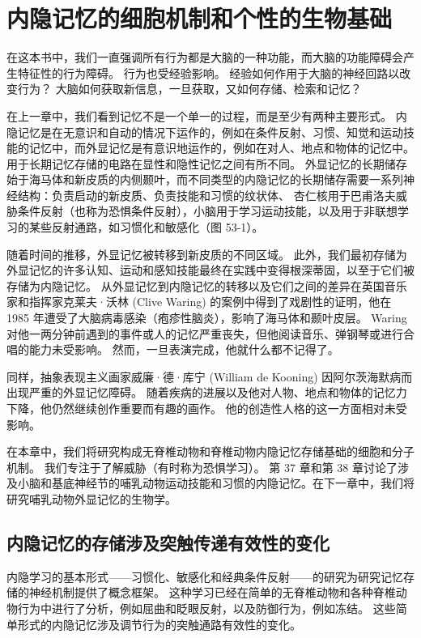 \chapter{内隐记忆的细胞机制和个性的生物基础}

在这本书中，我们一直强调所有行为都是大脑的一种功能，而大脑的功能障碍会产生特征性的行为障碍。 行为也受经验影响。 经验如何作用于大脑的神经回路以改变行为？ 大脑如何获取新信息，一旦获取，又如何存储、检索和记忆？

在上一章中，我们看到记忆不是一个单一的过程，而是至少有两种主要形式。 内隐记忆是在无意识和自动的情况下运作的，例如在条件反射、习惯、知觉和运动技能的记忆中，而外显记忆是有意识地运作的，例如在对人、地点和物体的记忆中。 用于长期记忆存储的电路在显性和隐性记忆之间有所不同。 外显记忆的长期储存始于海马体和新皮质的内侧颞叶，而不同类型的内隐记忆的长期储存需要一系列神经结构：负责启动的新皮质、负责技能和习惯的纹状体、 杏仁核用于巴甫洛夫威胁条件反射（也称为恐惧条件反射），小脑用于学习运动技能，以及用于非联想学习的某些反射通路，如习惯化和敏感化（图 53-1）。

随着时间的推移，外显记忆被转移到新皮质的不同区域。 此外，我们最初存储为外显记忆的许多认知、运动和感知技能最终在实践中变得根深蒂固，以至于它们被存储为内隐记忆。 从外显记忆到内隐记忆的转移以及它们之间的差异在英国音乐家和指挥家克莱夫·沃林 (Clive Waring) 的案例中得到了戏剧性的证明，他在 1985 年遭受了大脑病毒感染（疱疹性脑炎），影响了海马体和颞叶皮层。 Waring 对他一两分钟前遇到的事件或人的记忆严重丧失，但他阅读音乐、弹钢琴或进行合唱的能力未受影响。 然而，一旦表演完成，他就什么都不记得了。

同样，抽象表现主义画家威廉·德·库宁 (William de Kooning) 因阿尔茨海默病而出现严重的外显记忆障碍。 随着疾病的进展以及他对人物、地点和物体的记忆力下降，他仍然继续创作重要而有趣的画作。 他的创造性人格的这一方面相对未受影响。

在本章中，我们将研究构成无脊椎动物和脊椎动物内隐记忆存储基础的细胞和分子机制。 我们专注于了解威胁（有时称为恐惧学习）。 第 37 章和第 38 章讨论了涉及小脑和基底神经节的哺乳动物运动技能和习惯的内隐记忆。在下一章中，我们将研究哺乳动物外显记忆的生物学。


\section{内隐记忆的存储涉及突触传递有效性的变化}
内隐学习的基本形式——习惯化、敏感化和经典条件反射——的研究为研究记忆存储的神经机制提供了概念框架。 这种学习已经在简单的无脊椎动物和各种脊椎动物行为中进行了分析，例如屈曲和眨眼反射，以及防御行为，例如冻结。 这些简单形式的内隐记忆涉及调节行为的突触通路有效性的变化。

